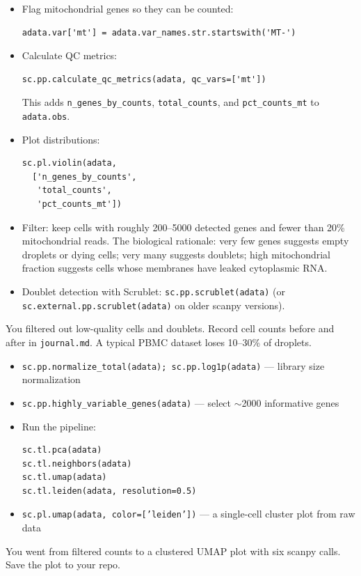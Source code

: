 \begin{itemize}[nosep]
  \item Flag mitochondrial genes so they can be counted:
    \begin{lstlisting}
adata.var['mt'] = adata.var_names.str.startswith('MT-')
    \end{lstlisting}
  \item Calculate QC metrics:
    \begin{lstlisting}
sc.pp.calculate_qc_metrics(adata, qc_vars=['mt'])
    \end{lstlisting}
    This adds \texttt{n\_genes\_by\_counts}, \texttt{total\_counts}, and \texttt{pct\_counts\_mt} to \texttt{adata.obs}.
  \item Plot distributions:
    \begin{lstlisting}
sc.pl.violin(adata,
  ['n_genes_by_counts',
   'total_counts',
   'pct_counts_mt'])
    \end{lstlisting}
  \item Filter: keep cells with roughly 200--5000 detected genes and fewer than 20\% mitochondrial reads. The biological rationale: very few genes suggests empty droplets or dying cells; very many suggests doublets; high mitochondrial fraction suggests cells whose membranes have leaked cytoplasmic RNA.
  \item Doublet detection with Scrublet: \texttt{sc.pp.scrublet(adata)} (or \texttt{sc.external.pp.scrublet(adata)} on older scanpy versions).
\end{itemize}
\begin{winbox}[Checkpoint]
You filtered out low-quality cells and doublets. Record cell counts before and after in \texttt{journal.md}. A typical PBMC dataset loses 10--30\% of droplets.
\end{winbox}

\begin{itemize}[nosep]
  \item \texttt{sc.pp.normalize\_total(adata); sc.pp.log1p(adata)} --- library size normalization
  \item \texttt{sc.pp.highly\_variable\_genes(adata)} --- select $\sim$2000 informative genes
  \item Run the pipeline:
    \begin{lstlisting}
sc.tl.pca(adata)
sc.tl.neighbors(adata)
sc.tl.umap(adata)
sc.tl.leiden(adata, resolution=0.5)
    \end{lstlisting}
  \item \texttt{sc.pl.umap(adata, color=['leiden'])} --- a single-cell cluster plot from raw data
\end{itemize}
\begin{winbox}[Checkpoint]
You went from filtered counts to a clustered UMAP plot with six scanpy calls. Save the plot to your repo.
\end{winbox}

